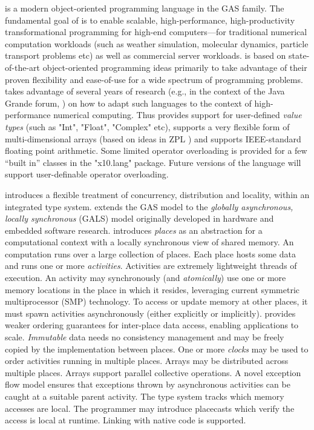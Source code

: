 \Xten{} is a modern object-oriented programming language
in the GAS family. The fundamental goal of \Xten{} is to enable
scalable, high-performance, high-productivity transformational
programming for high-end computers---for traditional numerical
computation workloads (such as weather simulation, molecular dynamics,
particle transport problems etc) as well as commercial server
workloads.
\Xten{} is based on state-of-the-art object-oriented
programming ideas primarily to take advantage of their proven
flexibility and ease-of-use for a wide spectrum of programming
problems. \Xten{} takes advantage of several years of research (e.g.,{}
in the context of the Java Grande forum,
\cite{moreira00java,kava}) on how to adapt such languages to the context of
high-performance numerical computing. Thus \Xten{} provides support
for user-defined {\em value types} (such as \xcd"Int", \xcd"Float",
\xcd"Complex" etc), supports a very
flexible form of multi-dimensional arrays (based on ideas in ZPL
\cite{zpl}) and supports IEEE-standard floating point arithmetic.
Some limited operator overloading is provided for a few ``built in''
classes in the \xcd"x10.lang" package.  Future versions of the
language will support user-definable operator overloading.

{}\Xten{} introduces a flexible treatment of concurrency, distribution
and locality, within an integrated type system. \Xten{} extends the
GAS model to the {\em globally asynchronous, locally synchronous}
(GALS) model originally developed in hardware and embedded software
research.  {}\Xten{} introduces {\em places} as an abstraction for a
computational context with a locally synchronous view of shared
memory. An \Xten{} computation runs over a large collection of places.
Each place hosts some data and runs one or more {\em
activities}. Activities are extremely lightweight threads of
execution. An activity may synchronously (and {\em atomically}) use
one or more memory locations in the place in which it resides,
leveraging current symmetric multiprocessor (SMP) technology.  
To access or update memory at other places, it must 
spawn activities asynchronously (either explicitly or implicitly).
\Xten{} provides weaker ordering guarantees for
inter-place data access, enabling applications to scale.  {\em
Immutable} data needs no consistency management and may be freely
copied by the implementation between places.  One or more {\em clocks}
may be used to order activities running in multiple
places.  Arrays may be distributed across multiple
places. Arrays support parallel collective operations. A novel
exception flow model ensures that exceptions thrown by asynchronous
activities can be caught at a suitable parent activity.  The type
system tracks which memory accesses are local. The programmer may
introduce placecasts which verify the access is local at runtime.
Linking with native code is supported.

